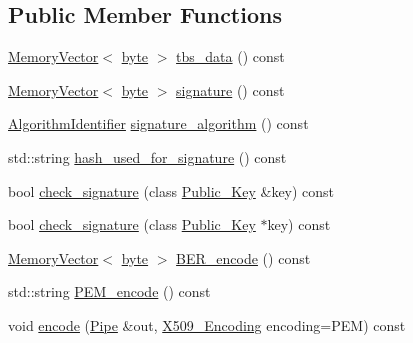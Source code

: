 \subsection*{Public Member Functions}
\begin{DoxyCompactItemize}
\item 
\hyperlink{classBotan_1_1MemoryVector}{Memory\-Vector}$<$ \hyperlink{namespaceBotan_a7d793989d801281df48c6b19616b8b84}{byte} $>$ \hyperlink{classBotan_1_1X509__Object_a8dd1e49b0e0cd42418e659cfc6c960d7}{tbs\-\_\-data} () const 
\item 
\hyperlink{classBotan_1_1MemoryVector}{Memory\-Vector}$<$ \hyperlink{namespaceBotan_a7d793989d801281df48c6b19616b8b84}{byte} $>$ \hyperlink{classBotan_1_1X509__Object_aee0ac3d797e197ade6e382713cd61e07}{signature} () const 
\item 
\hyperlink{classBotan_1_1AlgorithmIdentifier}{Algorithm\-Identifier} \hyperlink{classBotan_1_1X509__Object_aed269ac74ef4ebc9075740db772ff7bc}{signature\-\_\-algorithm} () const 
\item 
std\-::string \hyperlink{classBotan_1_1X509__Object_a79bbb29b968e7512f00481ce8592caf9}{hash\-\_\-used\-\_\-for\-\_\-signature} () const 
\item 
bool \hyperlink{classBotan_1_1X509__Object_af161996575d2b367197c3a31e1adbe3c}{check\-\_\-signature} (class \hyperlink{classBotan_1_1Public__Key}{Public\-\_\-\-Key} \&key) const 
\item 
bool \hyperlink{classBotan_1_1X509__Object_aee81119dfbab3e9de4d54fd0a55fab2b}{check\-\_\-signature} (class \hyperlink{classBotan_1_1Public__Key}{Public\-\_\-\-Key} $\ast$key) const 
\item 
\hyperlink{classBotan_1_1MemoryVector}{Memory\-Vector}$<$ \hyperlink{namespaceBotan_a7d793989d801281df48c6b19616b8b84}{byte} $>$ \hyperlink{classBotan_1_1X509__Object_af46d35d8d29be94f46b331e0e766bcdb}{B\-E\-R\-\_\-encode} () const 
\item 
std\-::string \hyperlink{classBotan_1_1X509__Object_abd15da7bae56fcae47606e313d508a7b}{P\-E\-M\-\_\-encode} () const 
\item 
void \hyperlink{classBotan_1_1X509__Object_a8a225c978af2a377c2939d2334112374}{encode} (\hyperlink{classBotan_1_1Pipe}{Pipe} \&out, \hyperlink{namespaceBotan_a53759b4ed1fb93549f307fcf68729d2f}{X509\-\_\-\-Encoding} encoding=P\-E\-M) const 
\end{DoxyCompactItemize}
